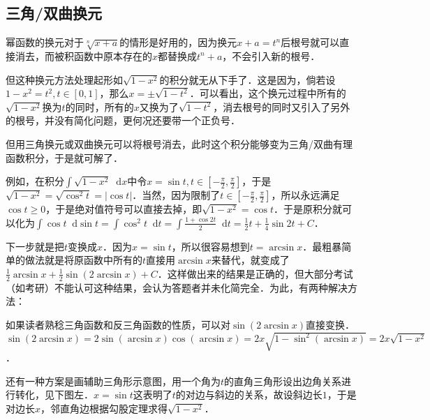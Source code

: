 \documentclass{ctexbook}
\newcommand*{\dif}{\mathop{}\!\mathrm{d}}
\begin{document}
\subsection{三角/双曲换元}
幂函数的换元对于$\sqrt[n]{x+a}$的情形是好用的，因为换元$x+a=t^{n}$后根号就可以直接消去，而被积函数中原本存在的$x$都替换成$t^{n}+a$，不会引入新的根号．\par
但这种换元方法处理起形如$\sqrt{1-x^{2}}$的积分就无从下手了．这是因为，倘若设$1-x^{2}=t^{2},t\in\left[0,1\right]$，那么$x=\pm\sqrt{1-t^{2}}$．可以看出，这个换元过程中所有的$\sqrt{1-x^{2}}$换为$t$的同时，所有的$x$又换为了$\sqrt{1-t^{2}}$，消去根号的同时又引入了另外的根号，并没有简化问题，更何况还要带一个正负号．\par
但用三角换元或双曲换元可以将根号消去，此时这个积分能够变为三角/双曲有理函数积分，于是就可解了．\par
例如，在积分$\int\sqrt{1-x^{2}}\dif{x}$中令$x=\sin{t},t\in\left[-\frac{\pi}{2},\frac{\pi}{2}\right]$，于是$\sqrt{1-x^{2}}=\sqrt{\cos^{2}{t}}=|\cos{t}|$．当然，因为限制了$t\in\left[-\frac{\pi}{2},\frac{\pi}{2}\right]$，所以永远满足$\cos{t}\ge0$，于是绝对值符号可以直接去掉，即$\sqrt{1-x^{2}}=\cos{t}$．于是原积分就可以化为$\int\cos{t}\dif{\sin{t}}=\int\cos^{2}{t}\dif{t}=\int\frac{1+\cos{2t}}{2}\dif{t}=\frac{1}{2}t+\frac{1}{4}\sin{2t}+C$．\par
下一步就是把$t$变换成$x$．因为$x=\sin{t}$，所以很容易想到$t=\arcsin{x}$．最粗暴简单的做法就是将原函数中所有的$t$直接用$\arcsin{x}$来替代，就变成了$\frac{1}{2}\arcsin{x}+\frac{1}{2}\sin{\left(2\arcsin{x}\right)}+C$．这样做出来的结果是正确的，但大部分考试（如考研）不能认可这种结果，会认为答题者并未化简完全．为此，有两种解决方法：\par
如果读者熟稔三角函数和反三角函数的性质，可以对$\sin{\left(2\arcsin{x}\right)}$直接变换．$\sin{\left(2\arcsin{x}\right)}=2\sin{\left(\arcsin{x}\right)}\cos{\left(\arcsin{x}\right)}=2x\sqrt{1-\sin^{2}{\left(\arcsin{x}\right)}}=2x\sqrt{1-x^{2}}$．\par
还有一种方案是画辅助三角形示意图，用一个角为$t$的直角三角形设出边角关系进行转化，见下图左．$x=\sin{t}$这表明了$t$的对边与斜边的关系，故设斜边长$1$，于是对边长$x$，邻直角边根据勾股定理求得$\sqrt{1-x^{2}}$．\par
{}$\qquad$
$\qquad$
\end{document}
